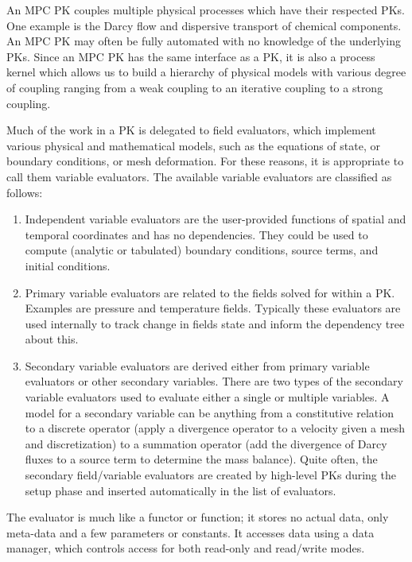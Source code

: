 An MPC PK couples multiple physical processes which have their respected PKs.
One example is the Darcy flow and dispersive transport of chemical components.
An MPC PK may often be fully automated with no knowledge of the underlying PKs.
Since an MPC PK has the same interface as a PK, it is also a process kernel which
allows us to build a hierarchy of physical models with various degree of coupling
ranging from a weak coupling to an iterative coupling to a strong coupling.

Much of the work in a PK is delegated to field evaluators, which implement various 
physical and mathematical models, such as the equations of state, or boundary conditions, 
or mesh deformation. 
For these reasons, it is appropriate to call them variable evaluators.
The available variable evaluators are classified as follows:

\begin{enumerate}
\item Independent variable evaluators are the user-provided functions of spatial and temporal coordinates
      and has no dependencies.
      They could be used to compute (analytic or tabulated) boundary conditions, source terms, and initial conditions. 
\item Primary variable evaluators are related to the fields solved for within a PK.
      Examples are pressure and temperature fields.
      Typically these evaluators are used internally to track change in fields state and inform the 
      dependency tree about this.
\item Secondary variable evaluators are derived either from primary variable evaluators or other secondary variables. 
      There are two types of the secondary variable evaluators used to evaluate either a single or multiple variables.
      A model for a secondary variable can be anything from a constitutive relation to a discrete operator
      (apply a divergence operator to a velocity given a mesh and discretization) 
      to a summation operator (add the divergence of Darcy fluxes to a source term to determine the mass balance).
      Quite often, the secondary field/variable evaluators are created by high-level PKs during the setup phase 
      and inserted automatically in the list of evaluators. 
\end{enumerate}

The evaluator is much like a functor or function; it stores no actual data, only meta-data and 
a few parameters or constants.
It accesses data using a data manager, which controls access for both read-only and read/write modes. 


